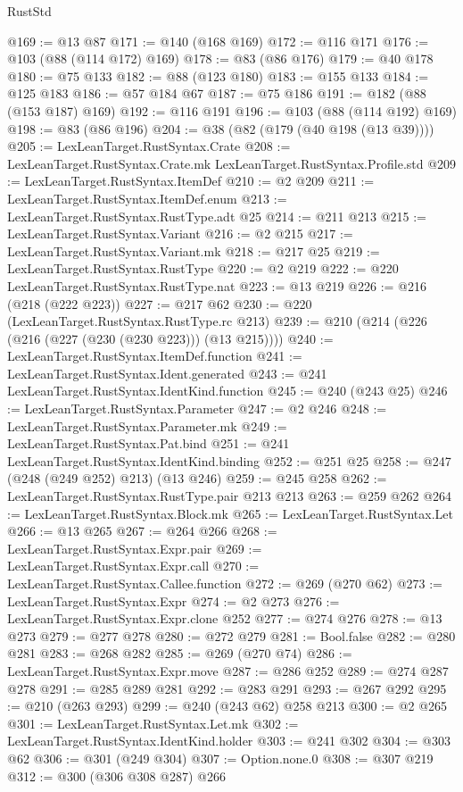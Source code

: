\begin{lexlean}{RustStd}
\begin{coremodule}
@169 := @13 @87
@171 := @140 (@168 @169)
@172 := @116 @171
@176 := @103 (@88 (@114 @172) @169)
@178 := @83 (@86 @176)
@179 := @40 @178
@180 := @75 @133
@182 := @88 (@123 @180)
@183 := @155 @133
@184 := @125 @183
@186 := @57 @184 @67
@187 := @75 @186
@191 := @182 (@88 (@153 @187) @169)
@192 := @116 @191
@196 := @103 (@88 (@114 @192) @169)
@198 := @83 (@86 @196)
@204 := @38 (@82 (@179 (@40 @198 (@13 @39))))
@205 := LexLeanTarget.RustSyntax.Crate
@208 := LexLeanTarget.RustSyntax.Crate.mk LexLeanTarget.RustSyntax.Profile.std
@209 := LexLeanTarget.RustSyntax.ItemDef
@210 := @2 @209
@211 := LexLeanTarget.RustSyntax.ItemDef.enum
@213 := LexLeanTarget.RustSyntax.RustType.adt @25
@214 := @211 @213
@215 := LexLeanTarget.RustSyntax.Variant
@216 := @2 @215
@217 := LexLeanTarget.RustSyntax.Variant.mk
@218 := @217 @25
@219 := LexLeanTarget.RustSyntax.RustType
@220 := @2 @219
@222 := @220 LexLeanTarget.RustSyntax.RustType.nat
@223 := @13 @219
@226 := @216 (@218 (@222 @223))
@227 := @217 @62
@230 := @220 (LexLeanTarget.RustSyntax.RustType.rc @213)
@239 := @210 (@214 (@226 (@216 (@227 (@230 (@230 @223))) (@13 @215))))
@240 := LexLeanTarget.RustSyntax.ItemDef.function
@241 := LexLeanTarget.RustSyntax.Ident.generated
@243 := @241 LexLeanTarget.RustSyntax.IdentKind.function
@245 := @240 (@243 @25)
@246 := LexLeanTarget.RustSyntax.Parameter
@247 := @2 @246
@248 := LexLeanTarget.RustSyntax.Parameter.mk
@249 := LexLeanTarget.RustSyntax.Pat.bind
@251 := @241 LexLeanTarget.RustSyntax.IdentKind.binding
@252 := @251 @25
@258 := @247 (@248 (@249 @252) @213) (@13 @246)
@259 := @245 @258
@262 := LexLeanTarget.RustSyntax.RustType.pair @213 @213
@263 := @259 @262
@264 := LexLeanTarget.RustSyntax.Block.mk
@265 := LexLeanTarget.RustSyntax.Let
@266 := @13 @265
@267 := @264 @266
@268 := LexLeanTarget.RustSyntax.Expr.pair
@269 := LexLeanTarget.RustSyntax.Expr.call
@270 := LexLeanTarget.RustSyntax.Callee.function
@272 := @269 (@270 @62)
@273 := LexLeanTarget.RustSyntax.Expr
@274 := @2 @273
@276 := LexLeanTarget.RustSyntax.Expr.clone @252
@277 := @274 @276
@278 := @13 @273
@279 := @277 @278
@280 := @272 @279
@281 := Bool.false
@282 := @280 @281
@283 := @268 @282
@285 := @269 (@270 @74)
@286 := LexLeanTarget.RustSyntax.Expr.move
@287 := @286 @252
@289 := @274 @287 @278
@291 := @285 @289 @281
@292 := @283 @291
@293 := @267 @292
@295 := @210 (@263 @293)
@299 := @240 (@243 @62) @258 @213
@300 := @2 @265
@301 := LexLeanTarget.RustSyntax.Let.mk
@302 := LexLeanTarget.RustSyntax.IdentKind.holder
@303 := @241 @302
@304 := @303 @62
@306 := @301 (@249 @304)
@307 := Option.none.{0}
@308 := @307 @219
@312 := @300 (@306 @308 @287) @266

\end{coremodule}
\end{lexlean}
